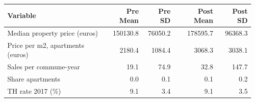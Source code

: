 
\begin{tabular}{lrrrr}
\toprule
Variable & Pre Mean & Pre SD & Post Mean & Post SD\\
\midrule
Median property price (euros) & 150130.8 & 76050.2 & 178595.7 & 96368.3\\
Price per m2, apartments (euros) & 2180.4 & 1084.4 & 3068.3 & 3038.1\\
Sales per commune-year & 19.1 & 74.9 & 32.8 & 147.7\\
Share apartments & 0.0 & 0.1 & 0.1 & 0.2\\
TH rate 2017 (\%) & 9.1 & 3.4 & 9.1 & 3.5\\
\bottomrule
\end{tabular}

